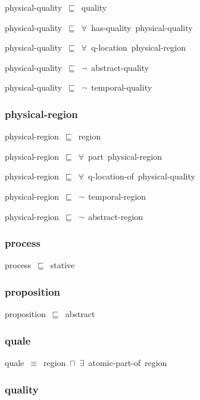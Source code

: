 \documentclass{article}
\begin{document}
physical-quality~\ensuremath{\sqsubseteq}~quality~

physical-quality~\ensuremath{\sqsubseteq}~\ensuremath{\forall}~has-quality~physical-quality~

physical-quality~\ensuremath{\sqsubseteq}~\ensuremath{\forall}~q-location~physical-region~

physical-quality~\ensuremath{\sqsubseteq}~\ensuremath{\lnot}~abstract-quality

physical-quality~\ensuremath{\sqsubseteq}~\ensuremath{\lnot}~temporal-quality

\subsubsection*{physical-region}

physical-region~\ensuremath{\sqsubseteq}~region~

physical-region~\ensuremath{\sqsubseteq}~\ensuremath{\forall}~part~physical-region~

physical-region~\ensuremath{\sqsubseteq}~\ensuremath{\forall}~q-location-of~physical-quality~

physical-region~\ensuremath{\sqsubseteq}~\ensuremath{\lnot}~temporal-region

physical-region~\ensuremath{\sqsubseteq}~\ensuremath{\lnot}~abstract-region

\subsubsection*{process}

process~\ensuremath{\sqsubseteq}~stative~

\subsubsection*{proposition}

proposition~\ensuremath{\sqsubseteq}~abstract~

\subsubsection*{quale}

quale~\ensuremath{\equiv}~region~\ensuremath{\sqcap}~\ensuremath{\exists}~atomic-part-of~region

\subsubsection*{quality}
\end{document}
